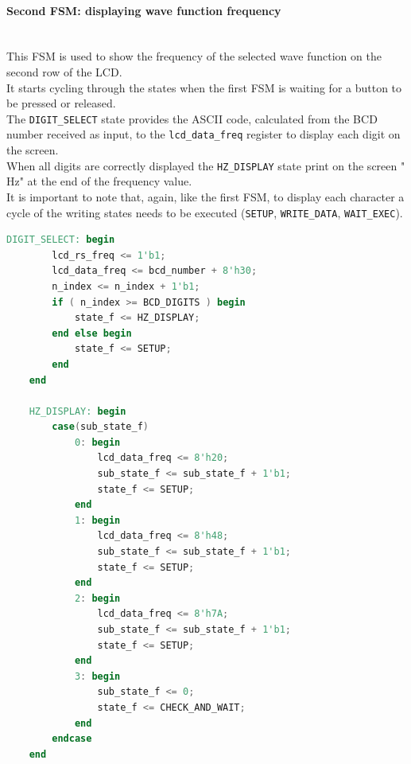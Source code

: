\paragraph{Second FSM: displaying wave function frequency} \quad \\
This FSM is used to show the frequency of the selected wave function on the second row of the LCD. \\
It starts cycling through the states when the first FSM is waiting for a button to be pressed or released. \\
The \texttt{DIGIT\_SELECT} state provides the ASCII code, calculated from the BCD number received as input, to the \texttt{lcd\_data\_freq} register to display each digit on the screen. \\
When all digits are correctly displayed the \texttt{HZ\_DISPLAY} state print on the screen " Hz" at the end of the frequency value. \\
It is important to note that, again, like the first FSM, to display each character a cycle of the writing states needs to be executed (\texttt{SETUP}, \texttt{WRITE\_DATA}, \texttt{WAIT\_EXEC}).

\vspace{1cm}
\begin{lstlisting}[language=Verilog, caption= Digit selection and Hz display ]
    DIGIT_SELECT: begin
        lcd_rs_freq <= 1'b1;
        lcd_data_freq <= bcd_number + 8'h30;
        n_index <= n_index + 1'b1;
        if ( n_index >= BCD_DIGITS ) begin
            state_f <= HZ_DISPLAY;
        end else begin
            state_f <= SETUP;
        end		 						
    end
         
    HZ_DISPLAY: begin
        case(sub_state_f)
            0: begin
                lcd_data_freq <= 8'h20;
                sub_state_f <= sub_state_f + 1'b1;
                state_f <= SETUP;
            end
            1: begin
                lcd_data_freq <= 8'h48;
                sub_state_f <= sub_state_f + 1'b1;
                state_f <= SETUP;
            end
            2: begin
                lcd_data_freq <= 8'h7A;
                sub_state_f <= sub_state_f + 1'b1;
                state_f <= SETUP;
            end	
            3: begin
                sub_state_f <= 0;
                state_f <= CHECK_AND_WAIT;
            end	
        endcase
    end
\end{lstlisting}
\vspace{1cm}



\newpage

